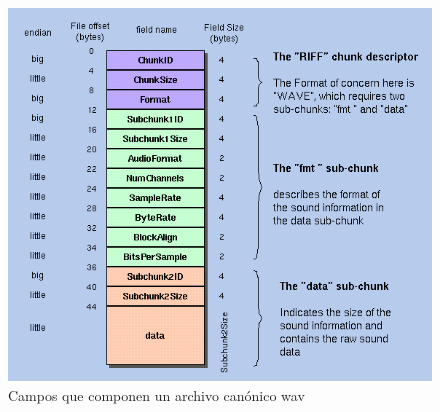\begin{figure}[H]
	\centering
	\includegraphics[scale=.7]{img/cabeceras.png}
	\caption{Campos que componen un archivo canónico wav}
	\label{fig:cabeceras}		
\end{figure}
